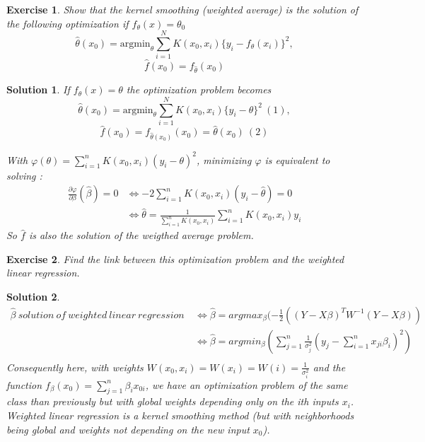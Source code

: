 \documentclass[12pt,a4paper]{article}
\newtheorem{exercise}{Exercise}
\newtheorem{solution}{Solution}
\begin{document}
\begin{exercise}
Show that the kernel smoothing (weighted average)  is the solution of the following optimization if $f_\theta(x)=\theta_0$
 $$\hat \theta(x_0)= \mathrm{argmin}_\theta \sum_{i=1}^N K(x_0,x_i) \{y_i-f_\theta(x_i)\}^2,$$
 $$ \hat f(x_0)= f_{\hat \theta} (x_0)$$
\end{exercise}
\begin{solution}
If $f_\theta(x)=\theta$ the optimization problem becomes 
$$\hat \theta(x_0)= \mathrm{argmin}_\theta \sum_{i=1}^N K(x_0,x_i) \{y_i-\theta\}^2\ (1),$$
 $$ \hat f(x_0)= f_{\hat \theta(x_0)} (x_0) = \hat \theta(x_0)\ (2) $$
 
 With $\varphi(\theta) = \sum_{i=1}^n K(x_0, x_i)(y_i - \theta)^2$, minimizing $\varphi$ is equivalent to solving :\\
\begin{equation}
\begin{split} 
 \frac{\partial \varphi}{\partial \beta} (\hat \beta)= 0 & \Longleftrightarrow -2 \sum_{i=1}^n K(x_0, x_i)(y_i - \hat \theta) = 0\\
 & \Longleftrightarrow \hat \theta = \frac{1}{\sum_{i=1}^n K(x_0, x_i)} \sum_{i=1}^n K(x_0, x_i) y_i
  \end{split}
\end{equation}
So $\hat f$ is also the solution of the weigthed average problem.    
\end{solution}

\begin{exercise}
Find the link between this optimization problem and the  weighted linear regression.
\end{exercise}

\begin{solution}
\begin{equation}
\begin{split}
\hat \beta\ solution\ of\ weighted\ linear\ regression\ & \Longleftrightarrow \hat \beta = argmax_\beta(- \frac{1}{2}((Y-X\beta)^TW^{-1}(Y-X\beta))\\
 & \Longleftrightarrow \hat \beta = argmin_\beta(\sum_{j=1}^n \frac{1}{\sigma_j^2}(y_j - \sum_{i=1}^nx_{ji}\beta_i)^2)\\
\end{split}
\end{equation}
Consequently here, with weights $W(x_0, x_i) = W(x_i) = W(i) = \frac{1}{\sigma_i^2}$ and the function $f_\beta(x_0) = \sum_{j=1}^n \beta_i x_{0i}$, we have an optimization problem of the same class than previously but with global weights depending only on the ith inputs $x_i$. Weighted linear regression is a kernel smoothing method (but with neighborhoods being global and weights not depending on the new input $x_0$).
\end{solution}
\end{document}
